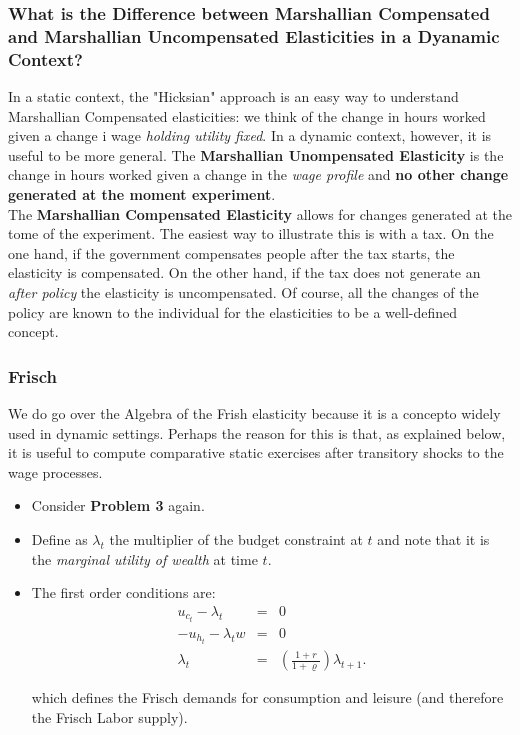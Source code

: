 \documentclass[11pt]{article}
\begin{document}
\subsubsection*{What is the Difference between Marshallian Compensated and Marshallian Uncompensated Elasticities in a Dyanamic Context?}
In a static context, the "Hicksian" approach is an easy way to understand Marshallian Compensated elasticities: we think of the change in hours worked given a change i wage \textit{holding utility fixed}. In a dynamic context, however, it is useful to be more general. The \textbf{Marshallian Unompensated Elasticity} is the change in hours worked given a change in the \textit{wage profile} and \textbf{no other change generated at the moment experiment}. \\
\indent The \textbf{Marshallian Compensated Elasticity} allows for changes generated at the tome of the experiment. The easiest way to illustrate this is with a tax. On the one hand, if the government compensates people after the tax starts, the elasticity is compensated. On the other hand, if the tax does not generate an \textit{after policy} the elasticity is uncompensated. Of course, all the changes of the policy are known to the individual for the elasticities to be a well-defined concept. 

\subsubsection*{Frisch}
We do go over the Algebra of the Frish elasticity because it is a concepto widely used in dynamic settings. Perhaps the reason for this is that, as explained below, it is useful to compute comparative static exercises after transitory shocks to the wage processes. 
\begin{itemize}

\item Consider \textbf{Problem 3} again.

\item Define as $\lambda _{t}$ the multiplier of the budget constraint at $t$
and note that it is the \textit{marginal utility of wealth} at time $t$. 

\item The first order conditions are:%
\begin{eqnarray}
u_{c_{t}}-\lambda _{t} &=&0  \nonumber \\ 
-u_{h_{t}}-\lambda _{t}w&=&0 \nonumber \\
\lambda _{t} &=&\left( \frac{1+r}{1+\varrho }\right) \lambda _{t+1} \label{eq:ds}.
\end{eqnarray}

which defines the Frisch demands for consumption and leisure (and therefore
the Frisch Labor supply).
\end{itemize}
\end{document}
